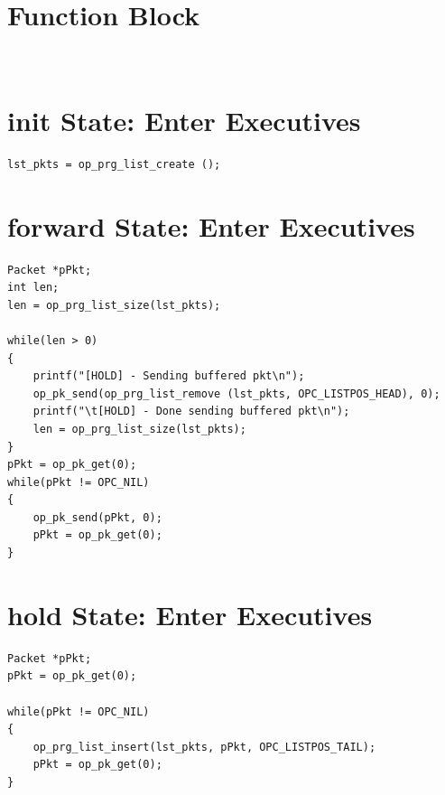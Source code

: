 \section{Function Block}
{\tiny
\begin{verbatim}


\end{verbatim}
}
\section{init State: Enter Executives}
{\tiny
\begin{verbatim}
lst_pkts = op_prg_list_create (); 
\end{verbatim}
}

\section{forward State: Enter Executives}
{\tiny
\begin{verbatim}
Packet *pPkt;
int len;
len = op_prg_list_size(lst_pkts);

while(len > 0)
{
	printf("[HOLD] - Sending buffered pkt\n");
	op_pk_send(op_prg_list_remove (lst_pkts, OPC_LISTPOS_HEAD), 0);
	printf("\t[HOLD] - Done sending buffered pkt\n");
	len = op_prg_list_size(lst_pkts);	
}
pPkt = op_pk_get(0);
while(pPkt != OPC_NIL)
{
	op_pk_send(pPkt, 0);
	pPkt = op_pk_get(0);
}

\end{verbatim}
}

\section{hold State: Enter Executives}
{\tiny
\begin{verbatim}
Packet *pPkt;
pPkt = op_pk_get(0);

while(pPkt != OPC_NIL)
{
	op_prg_list_insert(lst_pkts, pPkt, OPC_LISTPOS_TAIL);
	pPkt = op_pk_get(0);
}

\end{verbatim}
}